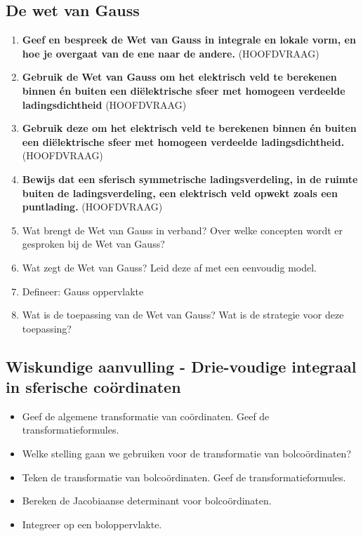 \documentclass[12pt]{article}
\begin{document}
    \subsection{De wet van Gauss}
    \begin{enumerate}
        \item \textbf{Geef en bespreek de Wet van Gauss in integrale en lokale vorm, en hoe je overgaat van de ene naar de andere.} (HOOFDVRAAG)
        \item \textbf{Gebruik de Wet van Gauss om het elektrisch veld te berekenen binnen én buiten een diëlektrische sfeer met homogeen verdeelde ladingsdichtheid} (HOOFDVRAAG)
        \item \textbf{Gebruik deze om het elektrisch veld te berekenen binnen én buiten een diëlektrische sfeer met homogeen verdeelde ladingsdichtheid.} (HOOFDVRAAG)
        \item \textbf{Bewijs dat een sferisch symmetrische ladings­verdeling, in de ruimte buiten de ladingsverdeling, een elektrisch veld opwekt zoals een puntlading.} (HOOFDVRAAG)
        \item Wat brengt de Wet van Gauss in verband? Over welke concepten wordt er gesproken bij de Wet van Gauss?
        \item Wat zegt de Wet van Gauss? Leid deze af met een eenvoudig model.
        \item Defineer: Gauss oppervlakte
        \item Wat is de toepassing van de Wet van Gauss? Wat is de strategie voor deze toepassing?
    \end{enumerate}
    \subsection*{Wiskundige aanvulling - Drie-voudige integraal in sferische coördinaten}
    \begin{itemize}
        \item Geef de algemene transformatie van coördinaten. Geef de transformatieformules.
        \item Welke stelling gaan we gebruiken voor de transformatie van bolcoördinaten?
        \item Teken de transformatie van bolcoördinaten. Geef de transformatieformules.
        \item Bereken de Jacobiaanse determinant voor bolcoördinaten.
        \item Integreer op een boloppervlakte.
    \end{itemize}
\end{document}

